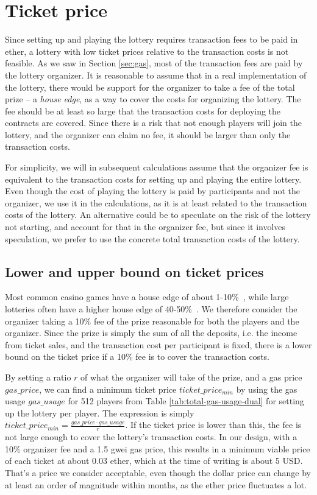 \section{Ticket price}
\label{sec:ticket-price}

Since setting up and playing the lottery requires transaction fees to be paid in ether, a lottery with low ticket prices relative to the transaction costs is not feasible. As we saw in Section \ref{sec:gas}, most of the transaction fees are paid by the lottery organizer. It is reasonable to assume that in a real implementation of the lottery, there would be support for the organizer to take a fee of the total prize – a \emph{house edge}, as a way to cover the costs for organizing the lottery. The fee should be at least so large that the transaction costs for deploying the contracts are covered. Since there is a risk that not enough players will join the lottery, and the organizer can claim no fee, it should be larger than only the transaction costs. 

For simplicity, we will in subsequent calculations assume that the organizer fee is equivalent to the transaction costs for setting up and playing the entire lottery. Even though the cost of playing the lottery is paid by participants and not the organizer, we use it in the calculations, as it is at least related to the transaction costs of the lottery. An alternative could be to speculate on the risk of the lottery not starting, and account for that in the organizer fee, but since it involves speculation, we prefer to use the concrete total transaction costs of the lottery.

\subsection{Lower and upper bound on ticket prices}
Most common casino games have a house edge of about 1-10\%~\cite{walsh_houses_nodate}, while large lotteries often have a higher house edge of 40-50\%~\cite{shackleford_house_nodate}. We therefore consider the organizer taking a 10\% fee of the prize reasonable for both the players and the organizer. Since the prize is simply the sum of all the deposits, i.e. the income from ticket sales, and the transaction cost per participant is fixed, there is a lower bound on the ticket price if a 10\% fee is to cover the transaction costs.

By setting a ratio $r$ of what the organizer will take of the prize, and a gas price $gas\_price$, we can find a minimum ticket price $ticket\_price_{min}$ by using the gas usage $gas\_usage$ for 512 players from Table \ref{tab:total-gas-usage-dual} for setting up the lottery per player. The expression is simply $ticket\_price_{min}=\frac{gas\_price \cdot gas\_usage}{r}$. If the ticket price is lower than this, the fee is not large enough to cover the lottery's transaction costs.
In our design, with a 10\% organizer fee and a 1.5 gwei gas price, this results in a minimum viable price of each ticket at about 0.03 ether, which at the time of writing is about 5 USD. That's a price we consider acceptable, even though the dollar price can change by at least an order of magnitude within months, as the ether price fluctuates a lot.

